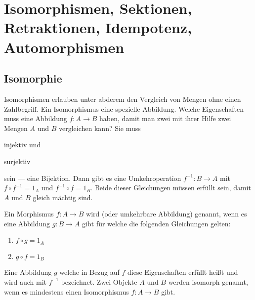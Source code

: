 \documentclass[parskip=half]{scrreprt}
\begin{document}
\chapter{Isomorphismen, Sektionen, Retraktionen, Idempotenz, Automorphismen}

\section{Isomorphie}

\begin{example}
Isomorphismen erlauben unter abderem den Vergleich von Mengen ohne einen Zahlbegriff.
Ein Isomorphismus eine spezielle Abbildung. Welche Eigenschaften muss eine 
Abbildung $f: A → B$ haben, damit man zwei mit ihrer Hilfe zwei Mengen $A$ und 
$B$ vergleichen kann? Sie muss 
\begin{enumerate*}
\item injektiv und 
\item surjektiv 
\end{enumerate*}
sein --- eine Bijektion. Dann gibt es eine Umkehroperation $f^{-1}: B → A$ 
mit $f ∘ f^{-1} = 1_A$ und $f^{-1} ∘ f = 1_B$.
Beide dieser Gleichungen müssen erfüllt sein, damit $A$ und $B$ gleich mächtig
sind.
\end{example}


\begin{definition}[Isomorphismus]\label{def:IsmomorphismAsInvertibleMorphism}
Ein Morphismus $f: A → B$ wird  
(oder umkehrbare Abbildung) genannt, wenn es eine Abbildung $g: B → A$ 
gibt für welche die folgenden Gleichungen gelten:
\begin{enumerate}
\item $f ∘ g = 1_A$
\item $g ∘ f = 1_B$
\end{enumerate}
Eine Abbildung $g$ welche in Bezug auf $f$ diese Eigenschaften erfüllt heißt 
 und wird auch mit $f^{-1}$ bezeichnet. Zwei Objekte 
$A$ und $B$ werden isomorph genannt, wenn es mindestens einen Isomorphismus 
$f: A → B$ gibt.
\end{definition}
\end{document}
